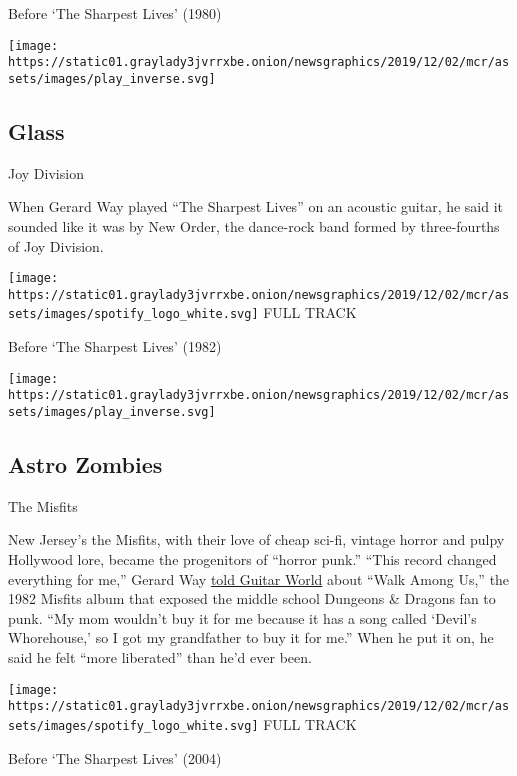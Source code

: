 Before `The Sharpest Lives' (1980)

\texttt{[image: https://static01.graylady3jvrrxbe.onion/newsgraphics/2019/12/02/mcr/assets/images/play\_inverse.svg]}

\hypertarget{glass}{%
\subsection{Glass}\label{glass}}

Joy Division

When Gerard Way played ``The Sharpest Lives'' on an acoustic guitar, he
said it sounded like it was by New Order, the dance-rock band formed by
three-fourths of Joy Division.

\href{https://open.spotify.com/track/4wuZsrGCkXZidmj1y54N3H?si=lDfpP8EORWKyVm_z0pNVaw}{}

\texttt{[image: https://static01.graylady3jvrrxbe.onion/newsgraphics/2019/12/02/mcr/assets/images/spotify\_logo\_white.svg]}
FULL TRACK

Before `The Sharpest Lives' (1982)

\texttt{[image: https://static01.graylady3jvrrxbe.onion/newsgraphics/2019/12/02/mcr/assets/images/play\_inverse.svg]}

\hypertarget{astro-zombies}{%
\subsection{Astro Zombies}\label{astro-zombies}}

The Misfits

New Jersey's the Misfits, with their love of cheap sci-fi, vintage
horror and pulpy Hollywood lore, became the progenitors of ``horror
punk.'' ``This record changed everything for me,'' Gerard Way
\href{https://www.guitarworld.com/features/record-changed-my-life}{told
Guitar World} about ``Walk Among Us,'' the 1982 Misfits album that
exposed the middle school Dungeons \& Dragons fan to punk. ``My mom
wouldn't buy it for me because it has a song called `Devil's
Whorehouse,' so I got my grandfather to buy it for me.'' When he put it
on, he said he felt ``more liberated'' than he'd ever been.

\href{https://open.spotify.com/track/0KK7xB8skO3Vo8soFjapOk}{}

\texttt{[image: https://static01.graylady3jvrrxbe.onion/newsgraphics/2019/12/02/mcr/assets/images/spotify\_logo\_white.svg]}
FULL TRACK

Before `The Sharpest Lives' (2004)

